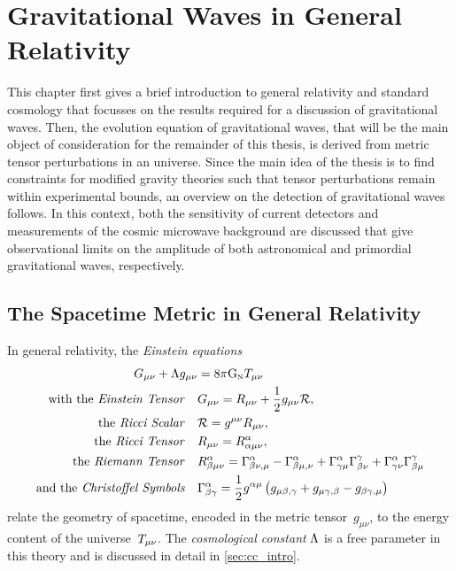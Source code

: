 \documentclass[12pt,parskip=half]{scrreprt}
\begin{document}
\chapter{Gravitational Waves in General Relativity}\label{ch:grav_waves}

This chapter first gives a brief introduction to general relativity and standard \FLRW cosmology that focusses on the results required for a discussion of gravitational waves. Then, the evolution equation of gravitational waves, that will be the main object of consideration for the remainder of this thesis, is derived from metric tensor perturbations in an \FLRW universe. Since the main idea of the thesis is to find constraints for modified gravity theories such that tensor perturbations remain within experimental bounds, an overview on the detection of gravitational waves follows. In this context, both the sensitivity of current detectors and measurements of the cosmic microwave background are discussed that give observational limits on the amplitude of both astronomical and primordial gravitational waves, respectively.

\section{The Spacetime Metric in General Relativity}\label{sec:gr}

In general relativity, the \emph{Einstein equations}
\begin{align}\label{eq:einstein_eqns}
	\Gtens_{\mu \nu} + \cosmconst g_{\mu\nu} &= 8 \pi \Newtconst \Ttens_{\mu \nu} \\
	\text{with the \emph{Einstein Tensor}} \quad &\Gtens_{\mu \nu} = \Rtens_{\mu \nu} + \frac{1}{2}g_{\mu \nu}\Rscal \eqpunct{,} \label{eq:einstein_tensor} \\
	\text{the \emph{Ricci Scalar}} \quad &\Rscal = g^{\mu \nu}\Rtens_{\mu \nu} \eqpunct{,} \\
	\text{the \emph{Ricci Tensor}} \quad &\Rtens_{\mu \nu} = \Riemtens^\alpha_{\alpha \mu \nu} \eqpunct{,} \\
	\text{the \emph{Riemann Tensor}} \quad &\Riemtens^\alpha_{\beta \mu \nu} = \Gamma^\alpha_{\beta \nu, \mu} - \Gamma^\alpha_{\beta \mu, \nu} + \Gamma^\alpha_{\gamma \mu}\Gamma^\gamma_{\beta \nu} + \Gamma^\alpha_{\gamma \nu}\Gamma^\gamma_{\beta \mu} \\
	\text{and the \emph{Christoffel Symbols}} \quad &\Gamma^\alpha_{\beta \gamma} = \frac{1}{2} g^{\alpha \mu} \del{g_{\mu \beta, \gamma} + g_{\mu \gamma, \beta} - g_{\beta \gamma, \mu}}
\end{align}
relate the geometry of spacetime, encoded in the metric tensor~\(g_{\mu \nu}\), to the energy content of the universe~\(T_{\mu \nu}\). The \emph{cosmological constant} \(\Lambda\) is a free parameter in this theory and is discussed in detail in \autoref{sec:cc_intro}.
\end{document}
